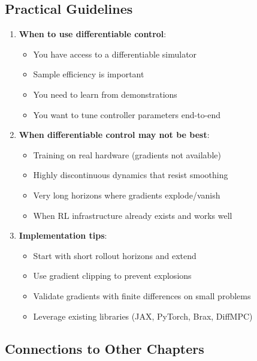 \subsection{Practical Guidelines}

\begin{enumerate}
    \item \textbf{When to use differentiable control}:
    \begin{itemize}
        \item You have access to a differentiable simulator
        \item Sample efficiency is important
        \item You need to learn from demonstrations
        \item You want to tune controller parameters end-to-end
    \end{itemize}

    \item \textbf{When differentiable control may not be best}:
    \begin{itemize}
        \item Training on real hardware (gradients not available)
        \item Highly discontinuous dynamics that resist smoothing
        \item Very long horizons where gradients explode/vanish
        \item When RL infrastructure already exists and works well
    \end{itemize}

    \item \textbf{Implementation tips}:
    \begin{itemize}
        \item Start with short rollout horizons and extend
        \item Use gradient clipping to prevent explosions
        \item Validate gradients with finite differences on small problems
        \item Leverage existing libraries (JAX, PyTorch, Brax, DiffMPC)
    \end{itemize}
\end{enumerate}

\subsection{Connections to Other Chapters}

